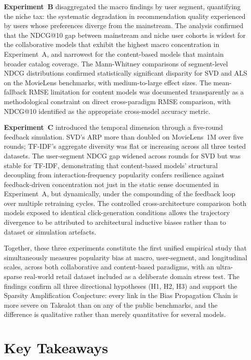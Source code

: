\documentclass[11pt,a4paper]{report}
\begin{document}
\textbf{Experiment~B} disaggregated the macro findings by user segment, quantifying the niche tax: the systematic degradation in recommendation quality experienced by users whose preferences diverge from the mainstream. The analysis confirmed that the NDCG@10 gap between mainstream and niche user cohorts is widest for the collaborative models that exhibit the highest macro concentration in Experiment~A, and narrowest for the content-based models that maintain broader catalog coverage. The Mann-Whitney comparisons of segment-level NDCG distributions confirmed statistically significant disparity for SVD and ALS on the MovieLens benchmarks, with medium-to-large effect sizes. The mean-fallback RMSE limitation for content models was documented transparently as a methodological constraint on direct cross-paradigm RMSE comparison, with NDCG@10 identified as the appropriate cross-model accuracy metric.

\textbf{Experiment~C} introduced the temporal dimension through a five-round feedback simulation. SVD's ARP more than doubled on MovieLens~1M over five rounds; TF-IDF's aggregate diversity was flat or increasing across all three tested datasets. The user-segment NDCG gap widened across rounds for SVD but was stable for TF-IDF, demonstrating that content-based models' structural decoupling from interaction-frequency popularity confers resilience against feedback-driven concentration not just in the static sense documented in Experiment~A, but dynamically, under the compounding of the feedback loop over multiple retraining cycles. The controlled cross-architecture comparison both models exposed to identical click-generation conditions allows the trajectory divergence to be attributed to architectural inductive biases rather than to dataset or simulation artefacts.

Together, these three experiments constitute the first unified empirical study that simultaneously measures popularity bias at macro, user-segment, and longitudinal scales, across both collaborative and content-based paradigms, with an ultra-sparse real-world retail dataset included as a deliberate domain stress test. The findings confirm all three directional hypotheses (H1, H2, H3) and support the Sparsity Amplification Conjecture: every link in the Bias Propagation Chain is more severe on Takealot than on any of the public benchmarks, and the difference is qualitative rather than merely quantitative for several models.

\section{Key Takeaways}
\label{sec:conc_takeaways}
\end{document}
